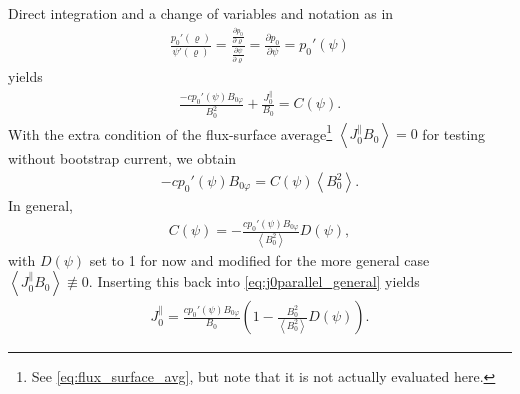 \documentclass[a4paper, twoside, 10pt, english]{article}
\numberwithin{equation}{section}
\let\temp\varrho
\let\varrho\rho
\let\rho\temp
\let\temp\vartheta
\let\vartheta\theta
\let\theta\temp
\let\temp\varphi
\let\varphi\phi
\let\phi\temp
\newcommand*\pd[2][]{\ensuremath{\frac{\partial #1}{\partial #2}}}  %
\begin{document}
Direct integration and a change of variables and notation as in
\begin{gather}
  \frac{p_{0}'(\rho)}{\psi'(\rho)} = \frac{\pd[p_{0}]{\rho}}{\pd[\psi]{\rho}} = \pd[p_{0}]{\psi} = p_{0}'(\psi)
\end{gather}
yields
\begin{gather}
  \frac{-c p_{0}' (\psi) B_{0 \phi}}{B_{0}^{2}} + \frac{J_{0}^{\parallel}}{B_{0}} = C(\psi). \label{eq:j0parallel_general}
\end{gather}
With the extra condition of the flux-surface average\footnote{See \cref{eq:flux_surface_avg}, but note that it is not actually evaluated here.} $\left\langle J_{0}^{\parallel} B_{0} \right\rangle = 0$ for testing without bootstrap current, we obtain
\begin{gather}
  -c p_{0}'(\psi) B_{0 \phi} = C(\psi) \left\langle B_{0}^{2} \right\rangle.
\end{gather}
In general, 
\begin{gather}
  C(\psi) = -\frac{c p_{0}'(\psi) B_{0 \phi}}{\left\langle B_{0}^{2} \right\rangle} D(\psi),
\end{gather}
with $D(\psi)$ set to 1 for now and modified for the more general case $\left\langle J_{0}^{\parallel} B_{0} \right\rangle \not\equiv 0$. Inserting this back into \cref{eq:j0parallel_general} yields
\begin{gather}
  J_{0}^{\parallel} = \frac{c p_{0}'(\psi) B_{0 \phi}}{B_{0}} \left( 1 - \frac{B_{0}^{2}}{\left\langle B_{0}^{2} \right\rangle} D(\psi) \right).
\end{gather}
\end{document}
